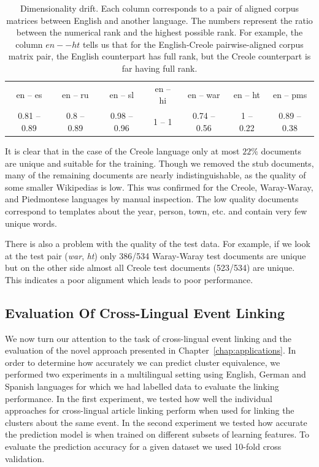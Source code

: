 \begin{table}[t]
\caption[Dimensionality drift]{Dimensionality drift. Each column corresponds to a pair of aligned corpus matrices between
English and another language. The numbers represent the ratio between the numerical rank and the highest
possible rank. For example, the column $en -- ht$ tells us that for the English-Creole pairwise-aligned
corpus matrix pair, the English counterpart has full rank, but the Creole counterpart is far having full rank.}
\begin{center}
\begin{tabular}{|c|c|c|c|c|c|c|}
\cline{1-7}
en -- es     &   en -- ru     &   en -- sl       &     en -- hi &   en -- war      &      en -- ht &   en -- pms\\
\cline{1-7}
0.81 -- 0.89   &  0.8 -- 0.89  &   0.98 -- 0.96    &    1 -- 1  &  0.74 -- 0.56  &      1 -- 0.22  &   0.89 -- 0.38\\
\cline{1-7}
\end{tabular}
\end{center}
\label{table:rank}
\end{table}

It is clear that in the case of the Creole language only at most $22\%$ documents are unique and suitable
for the training. Though we removed the stub documents, many of the remaining documents are nearly indistinguishable,
as the quality of some smaller Wikipedias is low. This was confirmed for the Creole, Waray-Waray,
and Piedmontese languages by manual inspection. The low quality documents correspond to templates
about the year, person, town, etc. and contain very few unique words.

There is also a problem with the quality of the test data. For example, if we look at the
test pair (\emph{war}, \emph{ht}) only 386/534 Waray-Waray test documents are unique but
on the other side almost all Creole test documents (523/534) are unique. This indicates a poor
alignment which leads to poor performance.


\subsection{Evaluation Of Cross-Lingual Event Linking}
We now turn our attention to the task of cross-lingual event linking and the
evaluation of the novel approach presented in Chapter~\ref{chap:applications}.
In order to determine how accurately we can predict cluster equivalence, we performed two
experiments in a multilingual setting using English, German and Spanish languages for which
we had labelled data to evaluate the linking performance. In the first experiment,
we tested how well the individual approaches for cross-lingual article linking
perform when used for linking the clusters about the same event. In the second
experiment we tested how accurate the prediction model is when trained on different
subsets of learning features. To evaluate the prediction accuracy for a given dataset
we used 10-fold cross validation.

